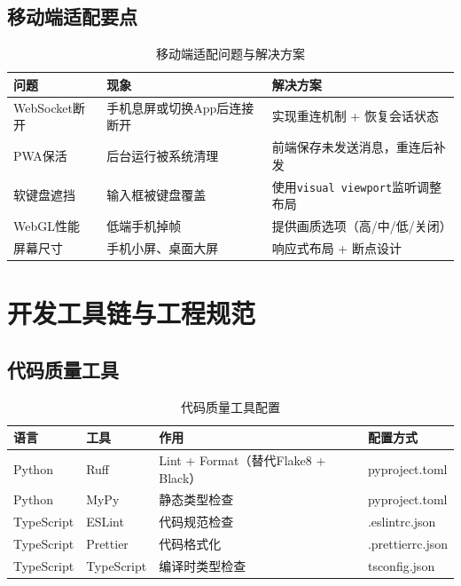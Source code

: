 \documentclass[fontset=mac,a4paper,11pt]{ctexart}
\begin{document}
\subsection{移动端适配要点}

\begin{table}[H]
\centering
\caption{移动端适配问题与解决方案}
\label{tab:mobile-adapt}
\begin{tabular}{L{3cm}L{4.5cm}L{4.5cm}}
\toprule
\textbf{问题} & \textbf{现象} & \textbf{解决方案} \\
\midrule
{}
WebSocket断开 & 手机息屏或切换App后连接断开 & 实现重连机制 + 恢复会话状态 \\
PWA保活 & 后台运行被系统清理 & 前端保存未发送消息，重连后补发 \\
软键盘遮挡 & 输入框被键盘覆盖 & 使用\texttt{visual viewport}监听调整布局 \\
WebGL性能 & 低端手机掉帧 & 提供画质选项（高/中/低/关闭） \\
屏幕尺寸 & 手机小屏、桌面大屏 & 响应式布局 + 断点设计 \\
\bottomrule
\end{tabular}
\end{table}

\section{开发工具链与工程规范}

\subsection{代码质量工具}

\begin{table}[H]
\centering
\caption{代码质量工具配置}
\label{tab:code-quality}
\begin{tabular}{L{2.5cm}L{3cm}L{5cm}L{2.5cm}}
\toprule
\textbf{语言} & \textbf{工具} & \textbf{作用} & \textbf{配置方式} \\
\midrule
{}
Python & Ruff & Lint + Format（替代Flake8 + Black） & pyproject.toml \\
Python & MyPy & 静态类型检查 & pyproject.toml \\
TypeScript & ESLint & 代码规范检查 & .eslintrc.json \\
TypeScript & Prettier & 代码格式化 & .prettierrc.json \\
TypeScript & TypeScript & 编译时类型检查 & tsconfig.json \\
\bottomrule
\end{tabular}
\end{table}
\end{document}

